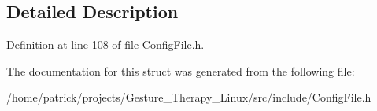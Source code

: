 \subsection{Detailed Description}


Definition at line 108 of file Config\+File.\+h.



The documentation for this struct was generated from the following file\+:\begin{DoxyCompactItemize}
\item 
/home/patrick/projects/\+Gesture\+\_\+\+Therapy\+\_\+\+Linux/src/include/Config\+File.\+h\end{DoxyCompactItemize}
